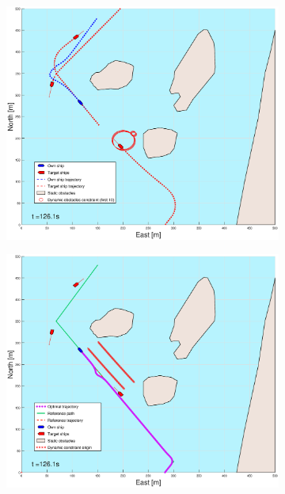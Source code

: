 \begin{figure}[ht]
\begin{subfigure}[b]{0.499\textwidth}
    \end{subfigure}
    \hfill
    \\
    \begin{subfigure}[b]{0.49\textwidth}
        \centering
        \includegraphics[width=\textwidth]{Images/Figures/Helloya_Rev/_Simple_0fig1_time=126}
    \end{subfigure}
    \hfill
    \begin{subfigure}[b]{0.499\textwidth}
        \centering
        \includegraphics[width=\textwidth]{Images/Figures/Helloya_Rev/_Simple_0fig999_time=126}

\end{subfigure}
\end{figure}
